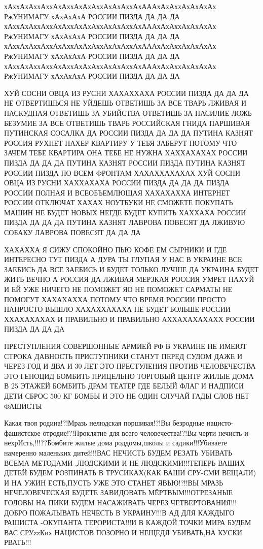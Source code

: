  
 
 
 

 
хАххАхАххАххАхАххАхАхАххАхАхАххАхАААхАхАххАхАхАхАх
РжУНИМАГУ хАхАхАхА РОССИИ ПИЗДА ДА ДА ДА 
хАххАхАххАххАхАххАхАхАххАхАхАххАхАААхАхАххАхАхАхАх
РжУНИМАГУ хАхАхАхА РОССИИ ПИЗДА ДА ДА ДА 
хАххАхАххАххАхАххАхАхАххАхАхАххАхАААхАхАххАхАхАхАх
РжУНИМАГУ хАхАхАхА РОССИИ ПИЗДА ДА ДА ДА 
хАххАхАххАххАхАххАхАхАххАхАхАххАхАААхАхАххАхАхАхАх
РжУНИМАГУ хАхАхАхА РОССИИ ПИЗДА ДА ДА ДА 

ХУЙ СОСНИ ОВЦА ИЗ РУСНИ ХАХАХХАХА РОССИИ ПИЗДА ДА ДА ДА 
НЕ ОТВЕРТИШЬСЯ НЕ УЙДЕШЬ ОТВЕТИШЬ ЗА ВСЕ ТВАРЬ ЛЖИВАЯ И ПАСКУДНАЯ
ОТВЕТИШЬ ЗА УБИЙСТВА ОТВЕТИШЬ ЗА НАСИЛИЕ ЛОЖЬ БЕЗУМИЕ 
ЗА ВСЕ ОТВЕТИШЬ ТВАРЬ РОССИЙСКАЯ ГНИДА ПАРШИВАЯ ПУТИНСКАЯ СОСАЛКА
ДА РОССИИ ПИЗДА ДА ДА ДА ПУТИНА КАЗНЯТ РОССИЯ РУХНЕТ НАХЕР
КВАРТИРУ У ТЕБЯ ЗАБЕРУТ ПОТОМУ ЧТО ЗАЧЕМ ТЕБЕ КВАРТИРА 
ОНА ТЕБЕ НЕ НУЖНА ХАХХАХАХАХ РОССИИ ПИЗДА ДА ДА ДА
ПУТИНА КАЗНЯТ РОССИИ ПИЗДА ПУТИНА КАЗНЯТ РОССИИ ПИЗДА ПО ВСЕМ ФРОНТАМ
ХАХАХХАХАХАХ ХУЙ СОСНИ ОВЦА ИЗ РУСНИ ХАХХАХАХА РОССИИ ПИЗДА ДА ДА ДА 
ПИЗДА РОССИИ ПОЛНАЯ И ВСЕОБЪЕМЛЮЩАЯ ХАХАХАХХА ИНТЕРНЕТ РОССИИ ОТКЛЮЧАТ ХАХАХ
НОУТБУКИ НЕ СМОЖЕТЕ ПОКУПАТЬ МАШИН НЕ БУДЕТ НОВЫХ НЕГДЕ БУДЕТ КУПИТЬ ХАХХАХА
РОССИИ ПИЗДА ДА ДА ДА ПУТИНА КАЗНЯТ ЛАВРОВА ПОВЕСЯТ ДА ЛЖИВУЮ СОБАКУ ЛАВРОВА
ПОВЕСЯТ ДА ДА ДА

ХАХАХХА Я СИЖУ СПОКОЙНО ПЬЮ КОФЕ ЕМ СЫРНИКИ И ГДЕ ИНТЕРЕСНО ТУТ ПИЗДА А ДУРА ТЫ
ГЛУПАЯ У НАС В УКРАИНЕ ВСЕ ЗАЕБИСЬ ДА ВСЕ ЗАЕБИСЬ И БУДЕТ ТОЛЬКО ЛУЧШЕ ДА
УКРАИНА БУДЕТ ЖИТЬ ВЕЧНО А РОССИЯ ДА ЛЖИВАЯ МЕРЗКАЯ РОССИЯ УМРЕТ НАХУЙ И ЕЙ УЖЕ
НИЧЕГО НЕ ПОМОЖЕТ ЯО НЕ ПОМОЖЕТ САРМАТЫ НЕ ПОМОГУТ ХАХАХАХХА ПОТОМУ ЧТО ВРЕМЯ
РОССИИ ПРОСТО НАПРОСТО ВЫШЛО ХАХАХХАХАХА НЕ БУДЕТ БОЛЬШЕ РОССИИ ХХАХАХАХАХ И
ПРАВИЛЬНО И ПРАВИЛЬНО АХХАХАХАХАХХ РОССИИ ПИЗДА ДА ДА ДА

ПРЕСТУПЛЕНИЯ СОВЕРШОННЫЕ АРМИЕЙ РФ В УКРАИНЕ
НЕ ИМЕЮТ СТРОКА ДАВНОСТЬ
ПРИСТУПНИКИ СТАНУТ ПЕРЕД СУДОМ ДАЖЕ И ЧЕРЕЗ ГОД И ДВА И 30 ЛЕТ ЭТО ПРЕСТУЛЕНИЯ ПРОТИВ ЧЕЛОВЕЧЕСТВА ЭТО ГЕНОЦИД
БОМБИТЬ ПРИЦЕЛЬНО ТОРГОВЫЙ ЦЕНТР
ЖИЛЫЕ ДОМА В 25 ЭТАЖЕЙ
БОМБИТЬ ДРАМ ТЕАТЕР ГДЕ БЕЛЫЙ ФЛАГ И НАДПИСИ ДЕТИ
СБРОС 500 КГ БОМБЫ И ЭТО НЕ ОДИН СЛУЧАЙ
ГАДЫ СЛОВ НЕТ ФАШИСТЫ

Какая твоя родина!?!Мразь нелюдская поршивая!?!Вы безродные нацисто-фашистское
отродие!?!Проклятие для всего человечества!?!Вы черти нечисть и
нехрИсть,!!!??Бомбите жилые дома роддомы,школы и садики!!!Убиваете намеренно
маленьких дитей!!!ВАС НЕЧИСТЬ БУДЕМ РЕЗАТЬ УБИВАТЬ ВСЕМА МЕТОДАМИ ,ЛЮДСКИМИ И
НЕ ЛЮДСКИМИ!!!ТЕПЕРЬ ВАШИХ ДЕТЕЙ БУДЕМ РОЗПИНАТЬ В ТРУСИКАХ(КАК ВАШИ СРУ-СМИ
ВЕЩАЛИ) И НА УЖИН ЕСТЬ,ПУСТЬ УЖЕ ЭТО СТАНЕТ ЯВЬЮ!?!!ВЫ МРАЗЬ НЕЧЕЛОВЕЧЕСКАЯ
БУДЕТЕ ЗАВИДОВАТЬ МЁРТВЫМ!!!ОТРЕЗАНЫЕ ГОЛОВЫ НА ПИКИ БУДЕМ НАСАЖИВАТЬ ЧЕРЕЗ
ЧЕТВЕРТОВАНИЯ!!!ДОБРО ПОЖАЛЫВАТЬ НЕЧЕСТЬ В УКРАИНУ!!!В АД ДЛЯ КАЖДЫГО РАШИСТА
-ОКУПАНТА ТЕРОРИСТА!!!И В КАЖДОЙ ТОЧКИ МИРА БУДЕМ ВАС СРУzzКих НАЦИСТОВ ПОЗОРНО
И НЕЩЕДЯ УБИВАТЬ,НА КУСКИ РВАТЬ!!!

